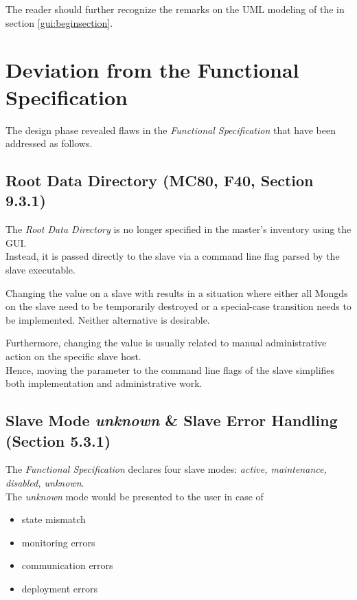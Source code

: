 The reader should further recognize the remarks on the UML modeling of the  in section \ref{gui:beginsection}.

\section{Deviation from the Functional Specification}

The design phase revealed flaws in the \emph{Functional Specification} that have been addressed as follows.

\subsection{Root Data Directory (MC80, F40, Section 9.3.1)}

The \emph{Root Data Directory} is no longer specified in the master's inventory using the GUI.\\
Instead, it is passed directly to the slave via a command line flag parsed by the slave executable.

Changing the value on a slave with   results in a situation where either
all Mongds on the slave need to be temporarily destroyed or a special-case transition needs to be implemented.
Neither alternative is desirable.

Furthermore, changing the value is usually related to manual administrative action on the specific slave host.\\
Hence, moving the parameter to the command line flags of the slave simplifies both implementation and administrative work.

\subsection{Slave Mode \emph{unknown} \& Slave Error Handling (Section 5.3.1)}

The \emph{Functional Specification} declares four slave modes: \emph{active, maintenance, disabled, unknown}.\\
The \emph{unknown} mode would be presented to the user in case of
\begin{itemize}
  \item state mismatch
  \item monitoring errors
  \item communication errors
  \item deployment errors
\end{itemize}


